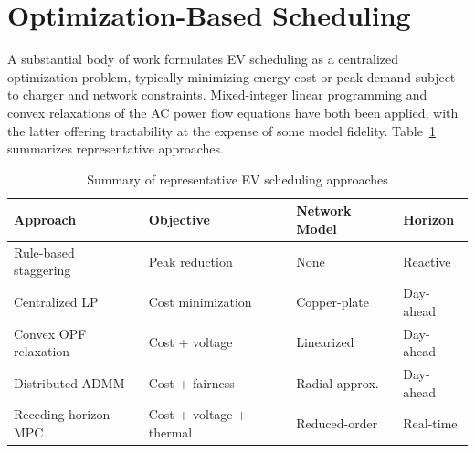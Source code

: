\section{Optimization-Based Scheduling}
A substantial body of work formulates EV scheduling as a centralized optimization problem,
typically minimizing energy cost or peak demand subject to charger and network constraints.
Mixed-integer linear programming and convex relaxations of the AC power flow equations have
both been applied, with the latter offering tractability at the expense of some model fidelity.
Table~\ref{tab:litsummary} summarizes representative approaches.

\begin{table}[htbp]
\centering
\caption{Summary of representative EV scheduling approaches}
\label{tab:litsummary}
\small
\begin{tabular}{@{}p{3.0cm}p{4.4cm}p{3.0cm}p{3.0cm}@{}}
\toprule
\textbf{Approach} & \textbf{Objective} & \textbf{Network Model} & \textbf{Horizon} \\
\midrule
Rule-based staggering & Peak reduction & None & Reactive \\
Centralized LP & Cost minimization & Copper-plate & Day-ahead \\
Convex OPF relaxation & Cost + voltage & Linearized & Day-ahead \\
Distributed ADMM & Cost + fairness & Radial approx. & Day-ahead \\
Receding-horizon MPC & Cost + voltage + thermal & Reduced-order & Real-time \\
\bottomrule
\end{tabular}
\end{table}
